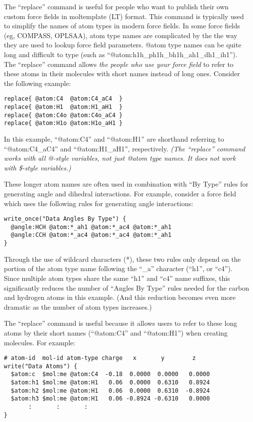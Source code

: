 \documentclass[11pt]{article}
\begin{document}
The ``replace'' command is useful for people who want to publish their own
custom force fields in moltemplate (LT) format.
This command is typically used to simplify the names of atom types
in modern force fields.  In some force fields (eg, COMPASS, OPLSAA), 
atom type names are complicated by the the way they are used to
lookup force field parameters.  @atom type names can be quite long
and difficult to type (such as ``@atom:h1h\_ph1h\_bh1h\_ah1\_dh1\_ih1'').
The ``replace'' command allows \textit{the people who use your force field} to
refer to these atoms in their molecules with short names instead of long ones.
Consider the following example:
\begin{verbatim}
replace{ @atom:C4  @atom:C4_aC4  }
replace{ @atom:H1  @atom:H1_aH1  }
replace{ @atom:C4o @atom:C4o_aC4 }
replace{ @atom:H1o @atom:H1o_aH1 }
\end{verbatim}
In this example, ``@atom:C4'' and ``@atom:H1'' are shorthand
referring to ``@atom:C4\_aC4'' and ``@atom:H1\_aH1'', respectively.
\textit{(The ``replace'' command works with all @-style variables, not
  just @atom type names.  It does not work with \$-style variables.)}

These longer atom names are often used in combination with ``By Type'' rules
for generating angle and dihedral interactions.  For example, consider a force
field which uses the following rules for generating angle interactions:
\begin{verbatim}
write_once("Data Angles By Type") {
  @angle:HCH @atom:*_ah1 @atom:*_ac4 @atom:*_ah1
  @angle:CCH @atom:*_ac4 @atom:*_ac4 @atom:*_ah1
}
\end{verbatim}
Through the use of wildcard characters (*), these two rules only depend
on the portion of the atom type name following the ``\_a'' character
(``h1'', or ``c4'').  Since multiple atom types share the same ``h1'' and ``c4''
name suffixes, this significantly reduces the number of ``Angles By Type''
rules needed for the carbon and hydrogen atoms in this example.  (And this
reduction becomes even more dramatic as the number of atom types increases.)

The ``replace'' command is useful because it allows users to refer to these
long atoms by their short names (``@atom:C4'' and ``@atom:H1'')
when creating molecules.  For example:
\begin{verbatim}
# atom-id  mol-id atom-type charge   x       y        z
write("Data Atoms") {
  $atom:c  $mol:me @atom:C4  -0.18  0.0000  0.0000   0.0000
  $atom:h1 $mol:me @atom:H1   0.06  0.0000  0.6310   0.8924
  $atom:h2 $mol:me @atom:H1   0.06  0.0000  0.6310  -0.8924
  $atom:h3 $mol:me @atom:H1   0.06 -0.8924 -0.6310   0.0000
       :       :       :
}
\end{verbatim}
\end{document}
